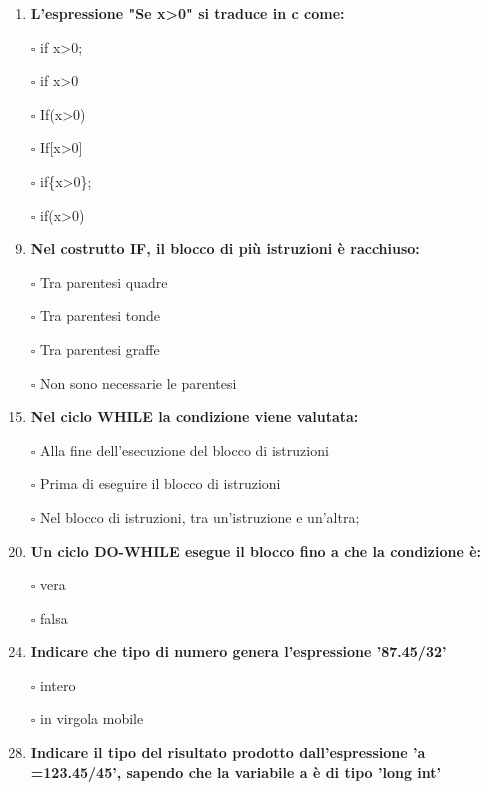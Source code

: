 \documentclass[9pt]{article}
\begin{document}
\begin{enumerate}
\item {\bf L'espressione "Se x>0" si traduce in c come:}
\item[$\square$]  if x>0;
\item[$\square$]  if x>0
\item[$\square$]  If(x>0)
\item[$\square$]  If[x>0]
\item[$\square$]  if\{x>0\};
\item[$\square$]  if(x>0)

\item [\nonumber]
\item {\bf Nel costrutto IF, il blocco di pi\`{u} istruzioni \`{e} racchiuso:}
\item[$\square$]  Tra parentesi quadre
\item[$\square$]  Tra parentesi tonde
\item[$\square$]  Tra parentesi graffe 
\item[$\square$]  Non sono necessarie le parentesi
\item [\nonumber]

\item {\bf Nel ciclo WHILE la condizione viene valutata:}
\item[$\square$]  Alla fine dell'esecuzione del blocco di istruzioni
\item[$\square$]  Prima di eseguire il blocco di istruzioni
\item[$\square$]  Nel blocco di istruzioni, tra un'istruzione e un'altra; 

\item [\nonumber]
\item {\bf Un ciclo DO-WHILE  esegue il blocco fino a che la condizione \`{e}:}
\item [$\square$] vera
\item [$\square$] falsa

\item [\nonumber]
\item{\bf Indicare che tipo di numero genera l'espressione '87.45/32'}

\item[$\square$] intero
\item[$\square$] in virgola mobile

\item [\nonumber]
\item {\bf Indicare il tipo del risultato prodotto dall'espressione 'a =123.45/45', sapendo che la variabile a \`{e} di tipo 'long int'}


\end{enumerate}
\end{document}

